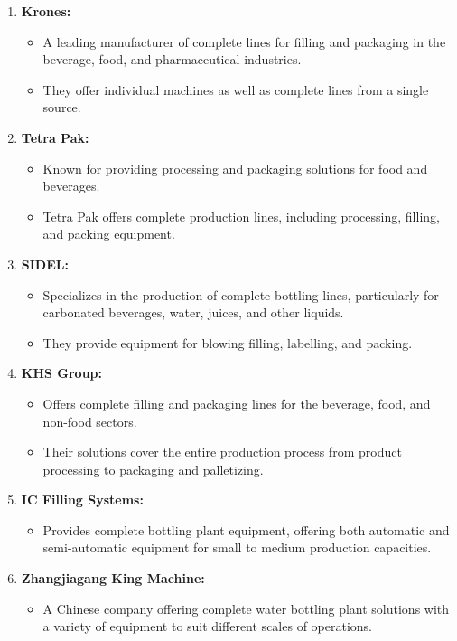\documentclass{article}
\begin{document}
\begin{enumerate}
  \item \textbf{Krones:}
  \begin{itemize}
    \item A leading manufacturer of complete lines for filling and packaging in the beverage, food, and pharmaceutical industries.
    \item They offer individual machines as well as complete lines from a single source.
  \end{itemize}
  
  \item \textbf{Tetra Pak:}
  \begin{itemize}
    \item Known for providing processing and packaging solutions for food and beverages.
    \item Tetra Pak offers complete production lines, including processing, filling, and packing equipment.
  \end{itemize}
  
  \item \textbf{SIDEL:}
  \begin{itemize}
    \item Specializes in the production of complete bottling lines, particularly for carbonated beverages, water, juices, and other liquids.
    \item They provide equipment for blowing filling, labelling, and packing.
  \end{itemize}
  
  \item \textbf{KHS Group:}
  \begin{itemize}
    \item Offers complete filling and packaging lines for the beverage, food, and non-food sectors.
    \item Their solutions cover the entire production process from product processing to packaging and palletizing.
  \end{itemize}
  
  \item \textbf{IC Filling Systems:}
  \begin{itemize}
    \item Provides complete bottling plant equipment, offering both automatic and semi-automatic equipment for small to medium production capacities.
  \end{itemize}
  
  \item \textbf{Zhangjiagang King Machine:}
  \begin{itemize}
    \item A Chinese company offering complete water bottling plant solutions with a variety of equipment to suit different scales of operations.
  \end{itemize}
\end{enumerate}
\end{document}
